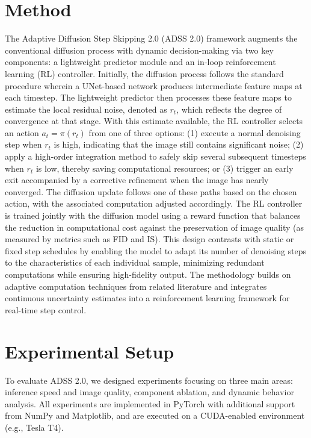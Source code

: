 \documentclass{article} %
\begin{document}
\section{Method}
\label{sec:method}
The Adaptive Diffusion Step Skipping 2.0 (ADSS 2.0) framework augments the conventional diffusion process with dynamic decision-making via two key components: a lightweight predictor module and an in-loop reinforcement learning (RL) controller. Initially, the diffusion process follows the standard procedure wherein a UNet-based network produces intermediate feature maps at each timestep. The lightweight predictor then processes these feature maps to estimate the local residual noise, denoted as \(r_t\), which reflects the degree of convergence at that stage. With this estimate available, the RL controller selects an action \(a_t = \pi(r_t)\) from one of three options: (1) execute a normal denoising step when \(r_t\) is high, indicating that the image still contains significant noise; (2) apply a high-order integration method to safely skip several subsequent timesteps when \(r_t\) is low, thereby saving computational resources; or (3) trigger an early exit accompanied by a corrective refinement when the image has nearly converged. The diffusion update follows one of these paths based on the chosen action, with the associated computation adjusted accordingly. The RL controller is trained jointly with the diffusion model using a reward function that balances the reduction in computational cost against the preservation of image quality (as measured by metrics such as FID and IS). This design contrasts with static or fixed step schedules by enabling the model to adapt its number of denoising steps to the characteristics of each individual sample, minimizing redundant computations while ensuring high-fidelity output. The methodology builds on adaptive computation techniques from related literature \cite{authorYearEfficient,li2023faster} and integrates continuous uncertainty estimates into a reinforcement learning framework for real-time step control.

\section{Experimental Setup}
\label{sec:experimental}
To evaluate ADSS 2.0, we designed experiments focusing on three main areas: inference speed and image quality, component ablation, and dynamic behavior analysis. All experiments are implemented in PyTorch with additional support from NumPy and Matplotlib, and are executed on a CUDA-enabled environment (e.g., Tesla T4).
\end{document}
